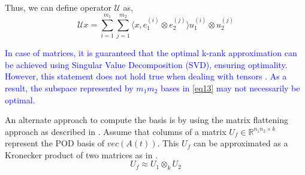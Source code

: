 \documentclass{article}
\begin{document}
Thus, we can define operator $\mathcal{U}$ as,
\begin{equation}\label{eq13} 
\mathcal{U}x=\sum_{i=1}^{m_1}\sum_{j=1}^{m_2} \langle x, e_1^{(i)} \otimes e_2^{(j)}\rangle u_1^{(i)} \otimes u_2^{(j)}
\end{equation}

\textcolor{blue}{In case of matrices, it is guaranteed that the optimal k-rank approximation can be achieved using Singular Value Decomposition (SVD), ensuring optimality. However, this statement does not hold true when dealing with tensors \cite{Kolda}. As a result, the subspace represented by $m_1m_2$ bases in \eqref{eq13} may not necessarily be optimal.}

An alternate approach to compute the basis is by using the matrix flattening approach as described in \cite{MDEIM}. Assume that columns of a matrix $U_f \in \mathbb{R}^{n_1n_2 \times k}$ represent the POD basis of $vec(A(t))$. 
This $U_f$ can be approximated as a Kronecker product of two matrices as in \cite{Loan93}.
\begin{equation*} 
U_f \approx U_1 \otimes_k U_2
\end{equation*}
\end{document}
